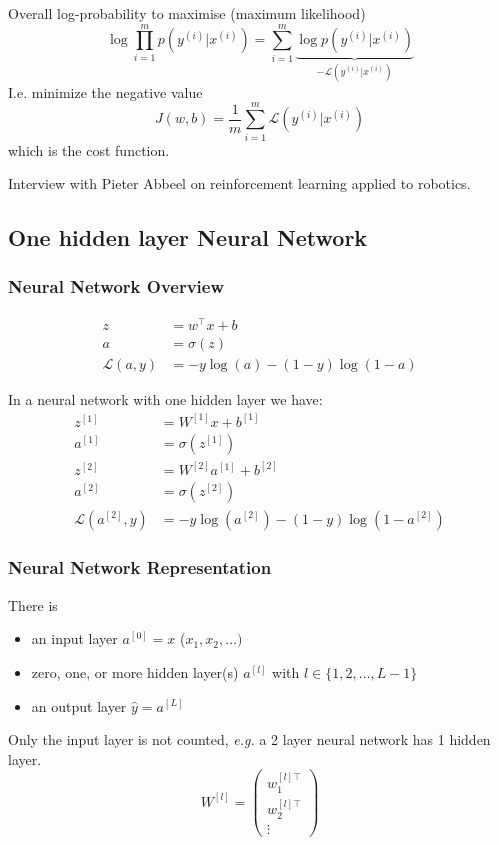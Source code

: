 \documentclass{article}
\begin{document}
Overall log-probability to maximise (maximum likelihood)
\begin{equation}
  \log\prod_{i=1}^m p(y^{(i)}|x^{(i)})=\sum_{i=1}^m \underbrace{\log p(y^{(i)}|x^{(i)})}_{-\mathcal{L}(y^{(i)}|x^{(i)})}
\end{equation}
I.e. minimize the negative value
\begin{equation}
  J(w,b)=\frac{1}{m}\sum_{i=1}^m \mathcal{L}(y^{(i)}|x^{(i)})
\end{equation}
which is the cost function.

Interview with Pieter Abbeel on reinforcement learning applied to robotics.

\subsection{One hidden layer Neural Network}
\subsubsection{Neural Network Overview}
\begin{equation}
  \begin{split}
    z&=w^\top x+b\\
    a&=\sigma(z)\\
    \mathcal{L}(a,y)&=-y\log(a)-(1-y)\log(1-a)
  \end{split}
\end{equation}

In a neural network with one hidden layer we have:
\begin{equation}
  \begin{split}
    z^{[1]}&=W^{[1]}x+b^{[1]}\\
    a^{[1]}&=\sigma(z^{[1]})\\
    z^{[2]}&=W^{[2]}a^{[1]}+b^{[2]}\\
    a^{[2]}&=\sigma(z^{[2]})\\
    \mathcal{L}(a^{[2]},y)&=-y\log(a^{[2]})-(1-y)\log(1-a^{[2]})
  \end{split}
\end{equation}

\subsubsection{Neural Network Representation}
There is
\begin{itemize}
  \item an input layer $a^{[0]}=x$ ($x_1, x_2, \ldots)$
  \item zero, one, or more hidden layer(s) $a^{[l]}$ with $l\in\{1,2,\ldots,L-1\}$
  \item an output layer $\hat{y}=a^{[L]}$
\end{itemize}
Only the input layer is not counted, \emph{e.g.} a 2 layer neural network has 1 hidden layer.
\begin{equation}
  W^{[l]}=
  \begin{pmatrix}
  w^{[l]\top}_1\\
  w^{[l]\top}_2\\
  \vdots
  \end{pmatrix}
\end{equation}
\end{document}
